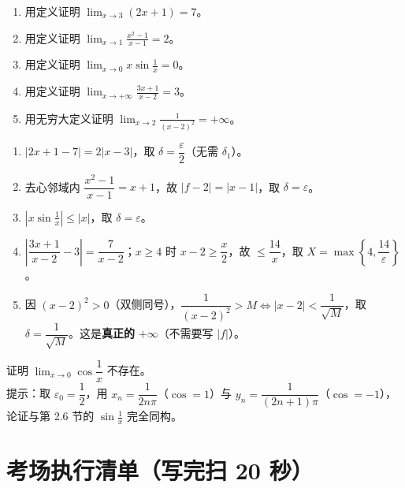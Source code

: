 \documentclass[11pt,a4paper]{ctexart}
\newcommand{\eps}{\varepsilon}
\newcommand{\abs}[1]{\left\lvert #1\right\rvert}
\begin{document}
\begin{enumerate}
\item 用定义证明 $\displaystyle\lim_{x\to3}(2x+1)=7$。
\item 用定义证明 $\displaystyle\lim_{x\to1}\frac{x^2-1}{x-1}=2$。
\item 用定义证明 $\displaystyle\lim_{x\to0}x\sin\frac1x=0$。
\item 用定义证明 $\displaystyle\lim_{x\to+\infty}\frac{3x+1}{x-2}=3$。
\item 用无穷大定义证明 $\displaystyle\lim_{x\to2}\frac{1}{(x-2)^2}=+\infty$。
\end{enumerate}

\begin{keypoint}[答案与关键步骤]
\begin{enumerate}
\item $\abs{2x+1-7}=2\abs{x-3}$，取 $\delta=\dfrac{\eps}{2}$（无需 $\delta_1$）。
\item 去心邻域内 $\dfrac{x^2-1}{x-1}=x+1$，故 $\abs{f-2}=\abs{x-1}$，取 $\delta=\eps$。
\item $\abs{x\sin\frac1x}\le\abs{x}$，取 $\delta=\eps$。
\item $\abs{\dfrac{3x+1}{x-2}-3}=\dfrac{7}{x-2}$；$x\ge4$ 时 $x-2\ge\dfrac x2$，故 $\le\dfrac{14}{x}$，取 $X=\max\left\{4,\dfrac{14}{\eps}\right\}$。
\item 因 $(x-2)^2>0$（双侧同号），$\dfrac1{(x-2)^2}>M\iff\abs{x-2}<\dfrac1{\sqrt M}$，取 $\delta=\dfrac1{\sqrt M}$。这是\textbf{真正的} $+\infty$（不需要写 $\abs{f}$）。
\end{enumerate}
\end{keypoint}

\begin{warnbox}
证明 $\lim_{x\to0}\cos\dfrac1x$ 不存在。\\
提示：取 $\eps_0=\dfrac12$，用 $x_n=\dfrac1{2n\pi}$（$\cos=1$）与 $y_n=\dfrac1{(2n+1)\pi}$（$\cos=-1$），论证与第 2.6 节的 $\sin\frac1x$ 完全同构。
\end{warnbox}

\section{考场执行清单（写完扫 20 秒）}
\end{document}
